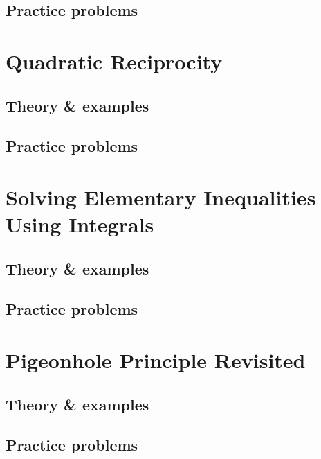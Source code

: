 \documentclass[oneside]{book}
\numberwithin{equation}{section}
\begin{document}
\subsection{Practice problems}


\section{Quadratic Reciprocity}

\subsection{Theory \& examples}

\subsection{Practice problems}


\section{Solving Elementary Inequalities Using Integrals}

\subsection{Theory \& examples}

\subsection{Practice problems}


\section{Pigeonhole Principle Revisited}

\subsection{Theory \& examples}

\subsection{Practice problems}
\end{document}
